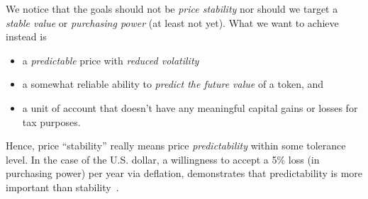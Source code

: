 We notice that the goals should not be \emph{price stability} nor should we
target a \emph{stable value} or \emph{purchasing power} (at least not yet). 
%
What we want to achieve instead is 
\begin{itemize}
 \item a \emph{predictable} price with \emph{reduced volatility}
 \item a somewhat reliable ability to \emph{predict the future value} of a token, and
 \item a unit of account that doesn't have any meaningful capital gains or
       losses for tax purposes.
\end{itemize}

Hence, price ``stability'' really means price \emph{predictability} within some
tolerance level. In the case of the U.S. dollar, a willingness to accept a 5\%
loss (in purchasing power) per year via deflation, demonstrates that
predictability is more important than stability~\cite{bm:stable:impossible}.
